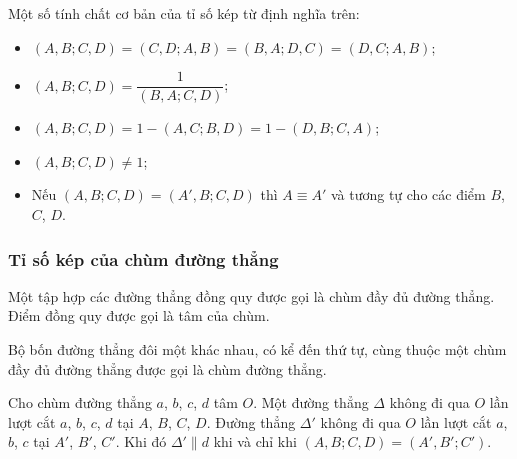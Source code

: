 \documentclass{article} %
\begin{document}
        \begin{property}
            Một số tính chất cơ bản của tỉ số kép từ định nghĩa trên:
            \begin{itemize}
                \itemsep 0.25cm
                \item \((A,B;C,D) = (C,D;A,B) = (B,A;D,C) = (D,C;A,B)\);
                \item \((A,B;C,D) = \dfrac{1}{(B,A;C,D)}\);
                \item \((A,B;C,D) = 1 - (A,C;B,D) = 1 - (D,B;C,A)\);
                \item \((A,B;C,D) \neq 1\);
                \item Nếu \((A,B;C,D) = (A',B;C,D)\) thì \(A \equiv A'\) và tương tự cho các điểm \(B\), \(C\), \(D\).
            \end{itemize}
        \end{property}

    \subsubsection*{Tỉ số kép của chùm đường thẳng}

        \begin{definition}
            Một tập hợp các đường thẳng đồng quy được gọi là chùm đầy đủ đường thẳng. Điểm đồng quy được gọi là tâm của chùm.
        \end{definition}

        \begin{definition}
            Bộ bốn đường thẳng đôi một khác nhau, có kể đến thứ tự, cùng thuộc một chùm đầy đủ đường thẳng được gọi là chùm đường thẳng.
        \end{definition}

        \begin{theorem}
            Cho chùm đường thẳng \(a\), \(b\), \(c\), \(d\) tâm \(O\). Một đường thẳng \(\Delta\) không đi qua \(O\) lần lượt cắt \(a\), \(b\), \(c\), \(d\) tại \(A\), \(B\), \(C\), \(D\). Đường thẳng \(\Delta'\) không đi qua \(O\) lần lượt cắt \(a\), \(b\), \(c\) tại \(A'\), \(B'\), \(C'\). Khi đó \(\Delta' \parallel d\) khi và chỉ khi \((A,B;C,D) = (A',B';C')\).
        \end{theorem}
\end{document}
